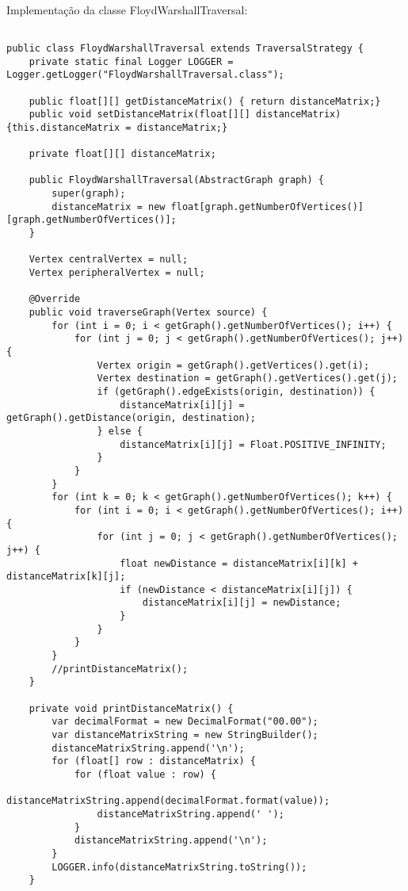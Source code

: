 \documentclass[a4paper, 12pt]{article}
\begin{document}
\begin{verbatim}
  
\end{verbatim}

Implementação da classe FloydWarshallTraversal:

\begin{verbatim}

public class FloydWarshallTraversal extends TraversalStrategy {
    private static final Logger LOGGER = Logger.getLogger("FloydWarshallTraversal.class");

    public float[][] getDistanceMatrix() { return distanceMatrix;}
    public void setDistanceMatrix(float[][] distanceMatrix) {this.distanceMatrix = distanceMatrix;}

    private float[][] distanceMatrix;

    public FloydWarshallTraversal(AbstractGraph graph) {
        super(graph);
        distanceMatrix = new float[graph.getNumberOfVertices()][graph.getNumberOfVertices()];
    }

    Vertex centralVertex = null;
    Vertex peripheralVertex = null;

    @Override
    public void traverseGraph(Vertex source) {
        for (int i = 0; i < getGraph().getNumberOfVertices(); i++) {
            for (int j = 0; j < getGraph().getNumberOfVertices(); j++) {
                Vertex origin = getGraph().getVertices().get(i);
                Vertex destination = getGraph().getVertices().get(j);
                if (getGraph().edgeExists(origin, destination)) {
                    distanceMatrix[i][j] = getGraph().getDistance(origin, destination);
                } else {
                    distanceMatrix[i][j] = Float.POSITIVE_INFINITY;
                }
            }
        }
        for (int k = 0; k < getGraph().getNumberOfVertices(); k++) {
            for (int i = 0; i < getGraph().getNumberOfVertices(); i++) {
                for (int j = 0; j < getGraph().getNumberOfVertices(); j++) {
                    float newDistance = distanceMatrix[i][k] + distanceMatrix[k][j];
                    if (newDistance < distanceMatrix[i][j]) {
                        distanceMatrix[i][j] = newDistance;
                    }
                }
            }
        }
        //printDistanceMatrix();
    }

    private void printDistanceMatrix() {
        var decimalFormat = new DecimalFormat("00.00");
        var distanceMatrixString = new StringBuilder();
        distanceMatrixString.append('\n');
        for (float[] row : distanceMatrix) {
            for (float value : row) {
                distanceMatrixString.append(decimalFormat.format(value));
                distanceMatrixString.append(' ');
            }
            distanceMatrixString.append('\n');
        }
        LOGGER.info(distanceMatrixString.toString());
    }


\end{verbatim}
\end{document}
